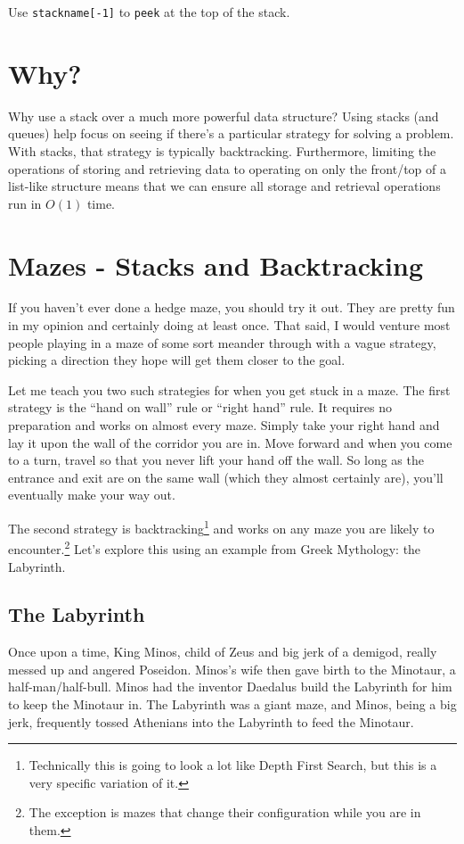 Use \texttt{stackname[-1]} to \texttt{peek} at the top of the stack.


\section{Why?}
Why use a stack over a much more powerful data structure?    Using stacks (and queues) help focus on seeing if there's a particular strategy for solving a problem.  With stacks, that strategy is typically backtracking.   Furthermore, limiting the operations of storing and retrieving data to operating on only the front/top of a list-like structure means that we can ensure all storage and retrieval operations run in $O(1)$ time.


\section{Mazes - Stacks and Backtracking}

If you haven't ever done a hedge maze, you should try it out.  They are pretty fun in my opinion and certainly doing at least once.  That said, I would venture most people playing in a maze of some sort meander through with a vague strategy, picking a direction they hope will get them closer to the goal.

Let me teach you two such strategies for when you get stuck in a maze.  The first strategy is the ``hand on wall'' rule or ``right hand'' rule.  It requires no preparation and works on almost every maze.  Simply take your right hand and lay it upon the wall of the corridor you are in.  Move forward and when you come to a turn, travel so that you never lift your hand off the wall.  So long as the entrance and exit are on the same wall (which they almost certainly are), you'll eventually make your way out.

The second strategy is backtracking\footnote{Technically this is going to look a lot like Depth First Search, but this is a very specific variation of it.} and works on any maze you are likely to encounter.\footnote{The exception is mazes that change their configuration while you are in them.}  Let's explore this using an example from Greek Mythology: the Labyrinth. 

\subsection{The Labyrinth}
Once upon a time, King Minos, child of Zeus and big jerk of a demigod, really messed up and angered Poseidon.  Minos's wife then gave birth to the Minotaur, a half-man/half-bull.  Minos had the inventor Daedalus build the Labyrinth for him to keep the Minotaur in.  The Labyrinth was a giant maze, and Minos, being a big jerk, frequently tossed Athenians into the Labyrinth to feed the Minotaur.  

